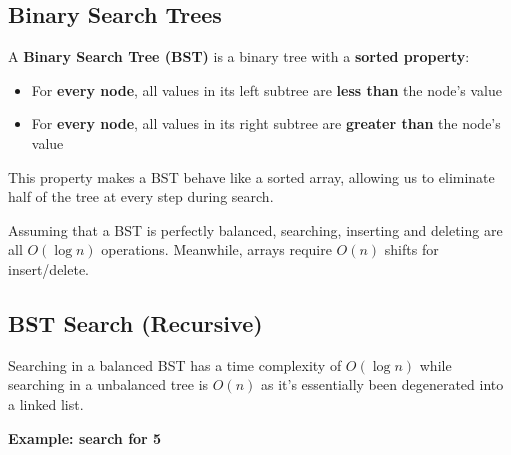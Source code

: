 \documentclass{article}
\begin{document}


\subsection{Binary Search Trees}

A \textbf{Binary Search Tree (BST)} is a binary tree with a \textbf{sorted property}:

\begin{itemize}
  \item For \textbf{every node}, all values in its left subtree are \textbf{less than} the node’s value
  \item For \textbf{every node}, all values in its right subtree are \textbf{greater than} the node’s value
\end{itemize}

This property makes a BST behave like a sorted array, allowing us to eliminate half of the tree at every step during search. 

Assuming that a BST is perfectly balanced, searching, inserting and deleting are all $O(\log n)$ operations. Meanwhile, arrays require $O(n)$ shifts for insert/delete.

\begin{center}
\end{center}

\subsection{BST Search (Recursive)}

Searching in a balanced BST has a time complexity of \textbf{$O(\log n)$} while searching in a unbalanced tree is $O(n)$ as it's essentially been degenerated into a linked list.

\textbf{Example: search for 5}

\begin{center}
\end{center}
\end{document}
